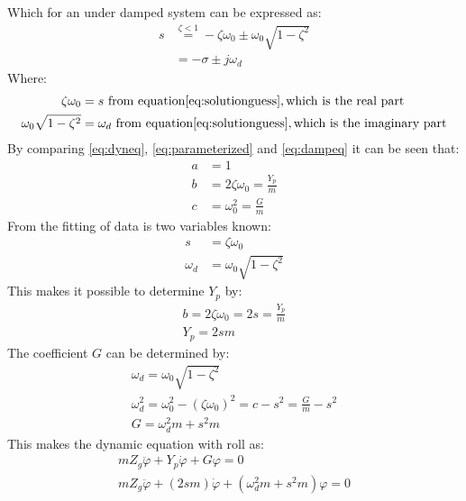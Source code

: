 Which for an under damped system can be expressed as:
\begin{align}
s &\stackrel{\zeta < 1}{=} -\zeta\omega_0\pm\omega_0\sqrt{1-\zeta^2}\\
&=-\sigma\pm j\omega_d
\end{align}
Where:
\begin{align}
\zeta\omega_0 &= s\ \text{from equation} \ref{eq:solutionguess}, \text{which is the real part}\\
\omega_0\sqrt{1-\zeta^2} &= \omega_d\ \text{from equation} \ref{eq:solutionguess}, \text{which is the imaginary part}
\end{align}
By comparing \ref{eq:dyneq}, \ref{eq:parameterized} and \ref{eq:dampeq} it can be seen that:
\begin{align}
a &= 1\\
b &= 2\zeta\omega_0 = \frac{Y_p}{m}\\
c &= \omega_0^2 = \frac{G}{m}
\end{align}
From the fitting of data is two variables known:
\begin{align}
s &= \zeta\omega_0\\
\omega_d&=\omega_0\sqrt{1-\zeta^2}
\end{align}
This makes it possible to determine $Y_p$ by:
\begin{align}
b = 2\zeta\omega_0 = 2s = \frac{Y_p}{m}\\
Y_p = 2sm
\end{align}
The coefficient $G$ can be determined by:
\begin{align}
\omega_d = \omega_0\sqrt{1-\zeta^2}\\
\omega_d^2 = \omega_0^2-(\zeta\omega_0)^2 = c - s^2 = \frac{G}{m}-s^2\\
G = \omega_d^2m+s^2m
\end{align}
This makes the dynamic equation with roll as:
\begin{align}
mZ_g\ddot \varphi + Y_p\dot \varphi + G\varphi = 0\\
mZ_g\ddot \varphi + (2sm)\dot \varphi + (\omega_d^2m+s^2m)\varphi = 0
\label{eq:solveddyneq}
\end{align}


